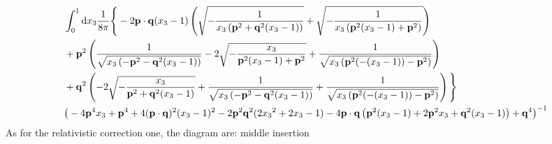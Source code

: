 \documentclass[aps,prd,preprint,showkeys,10pt]{revtex4-1}
\begin{document}
\begin{align*}
	  & \int_0^1\dd x_3\frac{1}{8\pi}\Bigg\{-2 {\vb{p}}\cdot {\vb{q}} ({x_3}-1) \left(\sqrt{-\frac{1}{{x_3} \left({\vb{p}}^2+{\vb{q}}^2 ({x_3}-1)\right)}}+\sqrt{-\frac{1}{{x_3} \left({\vb{p}}^2 ({x_3}-1)+{\vb{p}}^2\right)}}\right)
	\\&+{\vb{p}}^2 \left(\frac{1}{\sqrt{{x_3} \left(-{\vb{p}}^2-{\vb{q}}^2 ({x_3}-1)\right)}}-2 \sqrt{-\frac{{x_3}}{{\vb{p}}^2 ({x_3}-1)+{\vb{p}}^2}}+\frac{1}{\sqrt{{x_3} \left({\vb{p}}^2 (-({x_3}-1))-{\vb{p}}^2\right)}}\right)
	\\&+{\vb{q}}^2 \left(-2 \sqrt{-\frac{{x_3}}{{\vb{p}}^2+{\vb{q}}^2 ({x_3}-1)}}+\frac{1}{\sqrt{{x_3} \left(-{\vb{p}}^2-{\vb{q}}^2 ({x_3}-1)\right)}}+\frac{1}{\sqrt{{x_3} \left({\vb{p}}^2 (-({x_3}-1))-{\vb{p}}^2\right)}}\right)\Bigg\}
	\\&\big(-4 {\vb{p}}^4 {x_3}+{\vb{p}}^4+4 ({\vb{p}}\cdot {\vb{q}})^2 ({x_3}-1)^2 -2 {\vb{p}}^2 {\vb{q}}^2 (2{x_3}^2+2x_3-1) -4 {\vb{p}}\cdot {\vb{q}} \left({\vb{p}}^2 ({x_3}-1)+2 {\vb{p}}^2 {x_3}+{\vb{q}}^2 ({x_3}-1)\right)
	+{\vb{q}}^4\big)^{-1}
\end{align*}
As for the relativistic correction one, the diagram are: middle insertion
\end{document}
